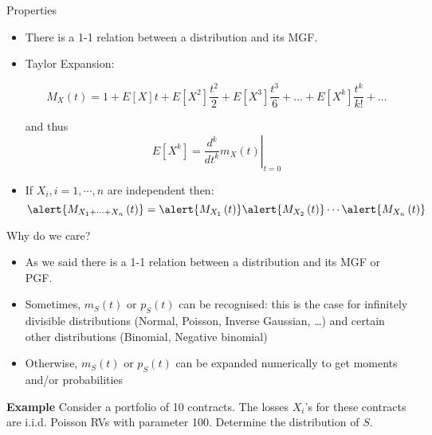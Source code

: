 \documentclass[11pt]{beamer}
\begin{document}
\begin{frame}{Properties}
  \begin{itemize}

  \item There is a 1-1 relation between a distribution and its MGF.

  \item Taylor Expansion:

$$ M_{X}\left( t\right)=1+E[X] t+ E[X^2]  \frac{t^2}{2} +E[X^3] \frac{t^3}{6} + \ldots + E[X^k] \frac{t^k}{k!}+\ldots $$  
  

 and thus
      $$E[X^k]=\left.\dfrac{d^{k}}{dt^{k}}m_{X}\left( t\right) \right|_{t=0}$$

  \item If $X_i, i=1,\cdots,n$ are independent then: $$\alert{M_{X_1+\cdots+X_n}\left( t\right)}=\alert{M_{X_1}\left( t\right)}\alert{M_{X_2}\left( t\right)}\cdots \alert{M_{X_n}\left( t\right)}$$
  \end{itemize}
\end{frame}
\begin{frame}{Why do we care?}

\begin{itemize}
  \item As we said there is a 1-1 relation between a distribution and its MGF or PGF.
  \vfill
  \item Sometimes, $m_S(t)$ or $p_S(t)$ can be recognised: this is the case for infinitely divisible distributions (Normal, Poisson, Inverse Gaussian, \ldots) and certain other distributions (Binomial, Negative binomial)
  \vfill
  \item Otherwise, $m_S(t)$ or $p_S(t)$ can be expanded \linebreak numerically to get moments and/or probabilities
  \end{itemize}

\end{frame}
\begin{frame}
\vspace{-2.5 cm}
  \textbf{Example}
  Consider a portfolio of 10 contracts. The losses $X_i$'s for these contracts are i.i.d. Poisson RVs with parameter 100.  Determine the distribution of $S$.
\end{frame}
\begin{frame}

\end{frame}
\end{document}
